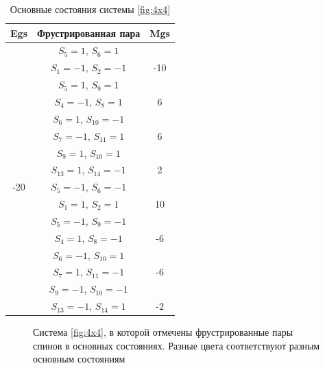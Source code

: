 \documentclass[utf8, babel, sor, jor, amsmath, amssymb, reprint]{elsarticle} %
\begin{document}
\begin{table}[h]
	\centering
	\begin{tabular}{|c|c|c|}
		\hline
		Egs   &   Фрустрированная пара & Mgs \\
		\hline
		  &  $S_5=1$, $S_6=1$& \\
		&    $S_1=-1$, $S_2=-1$ & -10\\
		\cline{2-3}
		   &  $S_5=1$, $S_9=1$& \\
		&    $S_4=-1$, $S_8=1$& 6\\
			\cline{2-3}
		  &  $S_6=1$, $S_{10}=-1$&\\
		&    $S_7=-1$, $S_{11}=1$& 6\\
		\cline{2-3}
		   &  $S_9=1$, $S_{10}=1$&\\
		&    $S_{13}=1$, $S_{14}=-1$& 2\\
		\cline{2-3}
		-20	\multirow{3}{*}{}
		  &  $S_5=-1$, $S_6=-1$&\\
		&    $S_1=1$, $S_2=1$& 10\\
		\cline{2-3}
		  &  $S_5=-1$, $S_9=-1$&\\
		&    $S_4=1$, $S_8=-1$& -6\\
		\cline{2-3}
		   &  $S_6=-1$, $S_{10}=1$&\\
		&    $S_7=1$, $S_{11}=-1$& -6\\
			\cline{2-3}
		  &  $S_9=-1$, $S_{10}=-1$&\\
		&    $S_{13}=-1$, $S_{14}=1$& -2\\
		\hline
	\end{tabular}
	\caption{Основные состояния системы \ref{fig:4x4}}
	\label{tab:gs_4x4}
\end{table}

\begin{figure}[h]
	\centering
	\caption{Система \ref{fig:4x4}, в которой отмечены фрустрированные пары спинов в основных состояниях. Разные цвета соответствуют разным основным состояниям}
	\label{fig:4x4.1}
\end{figure}
\end{document}
